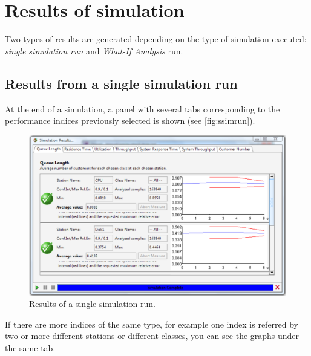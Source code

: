 \section{Results of simulation}
\label{ressults}

Two types of results are generated depending on the type of
simulation executed: \emph{single simulation run} and
\emph{What-If Analysis} run.

\subsection{Results from a single simulation run}
At the end of a simulation, a panel with several tabs
corresponding to the performance indices previously selected is
shown (see \autoref{fig:ssimrun}).\\
\begin{figure}[htb]
    \begin{center}
        \includegraphics[scale=.5]{img/jsimg/11.1.eps}
    \end{center}
    \caption{Results of a single simulation run.}
    \label{fig:ssimrun}
\end{figure}
If there are more indices of the same type, for example one index
is referred by two or more different stations or different classes,
you can see the graphs under the same tab.


